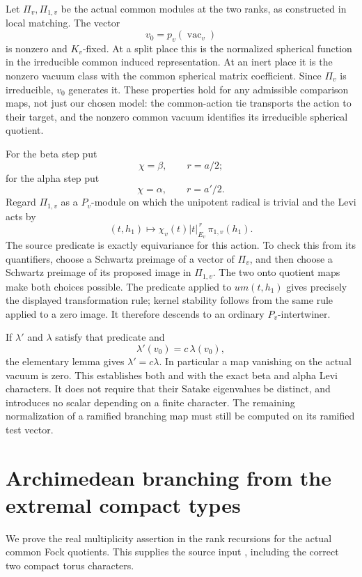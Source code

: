 Let \(\Pi_v,\Pi_{1,v}\) be the actual common modules at
the two ranks, as constructed in local matching. The vector
\[
                   v_0=p_v(\operatorname{vac}_v)
\]
is nonzero and \(K_v\)-fixed. At a split place this is
the normalized spherical function in the irreducible
common induced representation. At an inert place it
is the nonzero vacuum class with the common spherical
matrix coefficient. Since \(\Pi_v\) is irreducible,
\(v_0\) generates it. These properties hold for any
admissible comparison maps, not just our chosen model:
the common-action tie transports the action to their
target, and the nonzero common vacuum identifies its
irreducible spherical quotient.

For the beta step put
\[
              \chi=\beta,\qquad r=a/2;
\]
for the alpha step put
\[
              \chi=\alpha,\qquad r=a'/2.
\]
Regard \(\Pi_{1,v}\) as a \(P_v\)-module on which the
unipotent radical is trivial and the Levi acts by
\[
       (t,h_1)\longmapsto
              \chi_v(t)|t|_{E_v}^{\,r}\,\pi_{1,v}(h_1).
\]
The source predicate
 is exactly
equivariance for this action. To check this from its
quantifiers, choose a Schwartz preimage of a vector
of \(\Pi_v\), and then choose a Schwartz preimage of
its proposed image in \(\Pi_{1,v}\). The two onto
quotient maps make both choices possible.
The predicate applied to \(u m(t,h_1)\) gives precisely
the displayed transformation rule; kernel stability
follows from the same rule applied to a zero image.
It therefore descends to an ordinary \(P_v\)-intertwiner.

If \(\lambda'\) and \(\lambda\) satisfy that predicate
and
\[
                   \lambda'(v_0)=c\,\lambda(v_0),
\]
the elementary lemma gives \(\lambda'=c\lambda\).
In particular a map vanishing on the actual vacuum
is zero. This establishes both
 and
with the exact beta and alpha Levi characters.
It does not require that their Satake eigenvalues
be distinct, and introduces no scalar depending on
a finite character. The remaining normalization of
a ramified branching map must still be computed
on its ramified test vector.

\section{Archimedean branching from the extremal compact types}
\label{sec:sr-real-branching-compact-type}

We prove the real multiplicity assertion in the rank recursions
for the actual common Fock quotients. This supplies the source
input , including the
correct two compact torus characters.

